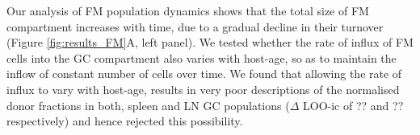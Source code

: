 \documentclass[11pt]{article}
\newcommand{\red}[1]{{\color{red}{#1}}}
\newcommand{\khi}{Ki67$^\text{hi}$}
\newcommand{\klo}{Ki67$^\text{lo}$}
\begin{document}
Our analysis of FM population dynamics shows that the total size of FM compartment increases with time, due to a gradual decline in their turnover (Figure \ref{fig:results_FM}A, left panel).
We tested whether the rate of influx of FM cells into the GC compartment also varies with host-age, so as to maintain the inflow of constant number of cells over time. 
We found that allowing the rate of influx to vary with host-age, results in very poor descriptions of the normalised donor fractions in both, spleen and LN GC populations ($\Delta$ LOO-ic of ?? and ?? respectively) and hence rejected this possibility.
\red{Therefore, follicular cells maturing into the GC compartment at any given time are proportional to the size of the FM population at that moment.}



%
\end{document}
